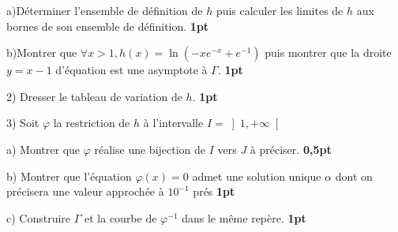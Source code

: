 \documentclass{article}
\begin{document}
	a)Déterminer l’ensemble de définition de $h$ puis calculer les limites de $h$ aux bornes de son ensemble de définition. \textbf{1pt}
	
	b)Montrer que $\forall x>1, h(x)=\ln(-xe^{-x}+e^{-1}) $ puis montrer que la droite $y=x-1$ d’équation est une asymptote à $\Gamma$. \textbf{1pt}
	
2) Dresser le tableau de variation de  $h$.   \textbf{1pt}
    
3) Soit $\varphi$ la restriction de $h$ à l’intervalle $I=\left] 1, +\infty \right[ $
    
    a) Montrer que $\varphi$  réalise une bijection de $I$ vers $J$  à préciser.
    \textbf{0,5pt}
        
    b) Montrer que l’équation $\varphi(x)=0$ admet une solution unique $\alpha$ dont on précisera une valeur approchée à $10^{-1}$ prés   \textbf{1pt}
    
    c) Construire $\Gamma$ et la courbe de $\varphi^{-1}$  dans le même repère.  \textbf{1pt}
\end{document}
